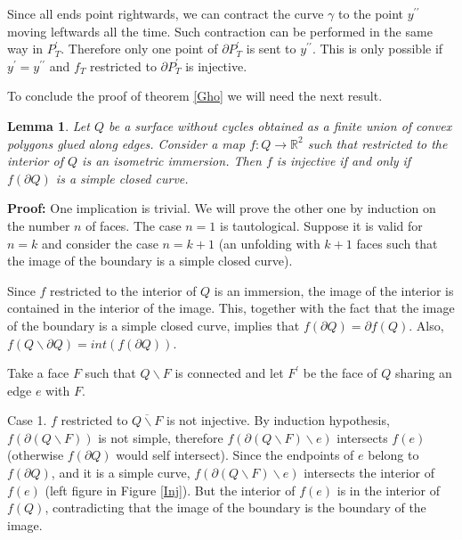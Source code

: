 \documentclass[openright, 12pt]{article}
\newtheorem{lema}[teorema]{Lemma}
\begin{document}
Since all ends point rightwards, we can contract the curve $\gamma$ to the point  $y^{\prime \prime}$ moving leftwards all the time. Such contraction can be performed in the same way in $P^{\prime}_T$. Therefore only one point of $\partial P^{\prime } _T$ is sent to $y^{\prime \prime}$. This is only possible if $y^{\prime} = y^{\prime \prime}$ and $f_T$ restricted to $\partial P^{\prime}_T$ is injective.


To conclude the proof of theorem \ref{Gho} we will need the next result.

\begin{lema}\label{Final}
{\rm Let $Q$ be a surface without cycles obtained as a finite union of convex polygons glued along edges. Consider a map $f: Q \rightarrow \mathbb{R}^2$ such that restricted to the interior of $Q$ is an isometric immersion. Then $f$ is injective if and only if $f(\partial Q)$ is a simple closed curve. 
}
\end{lema}

\textbf{Proof: }One implication is trivial. We will prove the other one by induction on the number $n$ of faces. The case $n=1$ is tautological. Suppose it is valid for $n=k$ and consider the case $n=k+1$ (an unfolding with $k+1$ faces such that the image of the boundary is a simple closed curve). 

Since $f $ restricted to the interior of $Q$ is an immersion, the image of the interior is contained in the interior of the image. This, together with the fact that the image of the boundary is a simple closed curve, implies that $f(\partial Q)  = \partial f(Q)$. Also, $f(Q \backslash \partial Q) = int (f(\partial Q) )$.


Take a face $F$ such that $Q \backslash F$ is connected and let $F^{\prime}$ be the face of $Q$ sharing an edge $e$ with $F$.

Case 1. $f$ restricted to $\overline{ Q\backslash F}$ is not injective. By induction hypothesis, $f(\partial (Q \backslash F))$ is not simple, therefore $f(\partial (Q \backslash F ) \backslash e) $ intersects $f(e)$ (otherwise $f(\partial Q)$ would self intersect). Since the endpoints of $e$ belong to $f(\partial Q)$, and it is a simple curve, $f(\partial (Q\backslash F) \backslash e)$ intersects the interior of $f(e)$ (left figure in Figure \ref{Inj}). But the interior of $f(e)$ is in the interior of $f(Q)$, contradicting that the image of the boundary is the boundary of the image.
\end{document}
